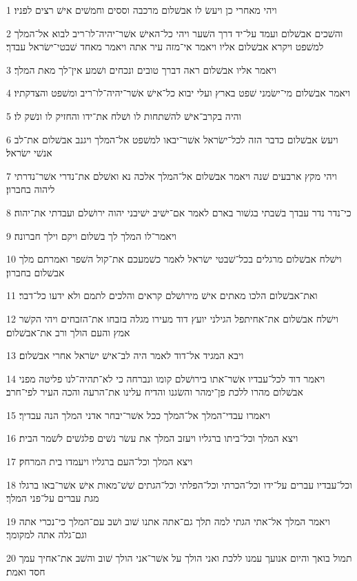 \par 1 ויהי מאחרי כן ויעשׂ לו אבשׁלום מרכבה וססים וחמשׁים אישׁ רצים לפניו׃
\par 2 והשׁכים אבשׁלום ועמד על־יד דרך השׁער ויהי כל־האישׁ אשׁר־יהיה־לו־ריב לבוא אל־המלך למשׁפט ויקרא אבשׁלום אליו ויאמר אי־מזה עיר אתה ויאמר מאחד שׁבטי־ישׂראל עבדך׃
\par 3 ויאמר אליו אבשׁלום ראה דברך טובים ונכחים ושׁמע אין־לך מאת המלך׃
\par 4 ויאמר אבשׁלום מי־ישׂמני שׁפט בארץ ועלי יבוא כל־אישׁ אשׁר־יהיה־לו־ריב ומשׁפט והצדקתיו׃
\par 5 והיה בקרב־אישׁ להשׁתחות לו ושׁלח את־ידו והחזיק לו ונשׁק לו׃
\par 6 ויעשׂ אבשׁלום כדבר הזה לכל־ישׂראל אשׁר־יבאו למשׁפט אל־המלך ויגנב אבשׁלום את־לב אנשׁי ישׂראל׃
\par 7 ויהי מקץ ארבעים שׁנה ויאמר אבשׁלום אל־המלך אלכה נא ואשׁלם את־נדרי אשׁר־נדרתי ליהוה בחברון׃
\par 8 כי־נדר נדר עבדך בשׁבתי בגשׁור בארם לאמר אם־ישׁיב ישׁיבני יהוה ירושׁלם ועבדתי את־יהוה׃
\par 9 ויאמר־לו המלך לך בשׁלום ויקם וילך חברונה׃
\par 10 וישׁלח אבשׁלום מרגלים בכל־שׁבטי ישׂראל לאמר כשׁמעכם את־קול השׁפר ואמרתם מלך אבשׁלום בחברון׃
\par 11 ואת־אבשׁלום הלכו מאתים אישׁ מירושׁלם קראים והלכים לתמם ולא ידעו כל־דבר׃
\par 12 וישׁלח אבשׁלום את־אחיתפל הגילני יועץ דוד מעירו מגלה בזבחו את־הזבחים ויהי הקשׁר אמץ והעם הולך ורב את־אבשׁלום׃
\par 13 ויבא המגיד אל־דוד לאמר היה לב־אישׁ ישׂראל אחרי אבשׁלום׃
\par 14 ויאמר דוד לכל־עבדיו אשׁר־אתו בירושׁלם קומו ונברחה כי לא־תהיה־לנו פליטה מפני אבשׁלום מהרו ללכת פן־ימהר והשׂגנו והדיח עלינו את־הרעה והכה העיר לפי־חרב׃
\par 15 ויאמרו עבדי־המלך אל־המלך ככל אשׁר־יבחר אדני המלך הנה עבדיך׃
\par 16 ויצא המלך וכל־ביתו ברגליו ויעזב המלך את עשׂר נשׁים פלגשׁים לשׁמר הבית׃
\par 17 ויצא המלך וכל־העם ברגליו ויעמדו בית המרחק׃
\par 18 וכל־עבדיו עברים על־ידו וכל־הכרתי וכל־הפלתי וכל־הגתים שׁשׁ־מאות אישׁ אשׁר־באו ברגלו מגת עברים על־פני המלך׃
\par 19 ויאמר המלך אל־אתי הגתי למה תלך גם־אתה אתנו שׁוב ושׁב עם־המלך כי־נכרי אתה וגם־גלה אתה למקומך׃
\par 20 תמול בואך והיום אנועך עמנו ללכת ואני הולך על אשׁר־אני הולך שׁוב והשׁב את־אחיך עמך חסד ואמת׃
